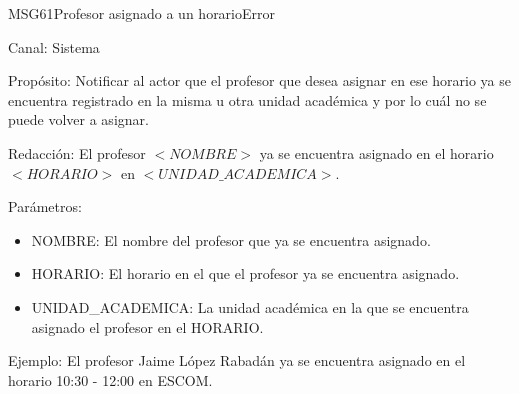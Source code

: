 



\begin{mensaje}{MSG61}{Profesor asignado a un horario}{Error}
	\item[Canal:] Sistema
	\item[Propósito:] Notificar al actor que el profesor que desea asignar en ese horario ya se encuentra registrado en la misma u otra unidad académica y por lo cuál no se puede volver a asignar.
	\item[Redacción:] El profesor $<NOMBRE>$ ya se encuentra asignado en el horario $<HORARIO>$ en $<UNIDAD\_ACADEMICA>$.
	\item[Parámetros:] 
	\begin{itemize}
		\item NOMBRE: El nombre del profesor que ya se encuentra asignado.
		\item HORARIO: El horario en el que el profesor ya se encuentra asignado.
		\item UNIDAD\_ACADEMICA: La unidad académica en la que se encuentra asignado el profesor en el HORARIO.
	\end{itemize}
	\item[Ejemplo:] El profesor Jaime López Rabadán ya se encuentra asignado en el horario 10:30 - 12:00 en ESCOM.
\end{mensaje}


